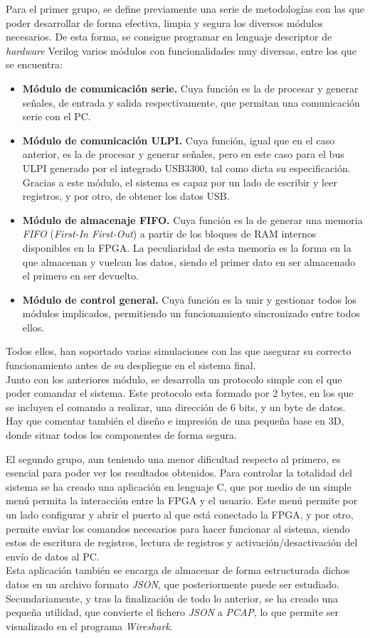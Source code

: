 \begin{resumen}
Para el primer grupo, se define previamente una serie de metodologías con las que poder desarrollar de forma efectiva, limpia y segura los diversos módulos necesarios. De esta forma, se consigue programar en lenguaje descriptor de \emph{hardware} Verilog varios módulos con funcionalidades muy diversas, entre los que se encuentra:
\begin{itemize}
    \item \textbf{Módulo de comunicación serie.} Cuya función es la de procesar y generar señales, de entrada y salida respectivamente, que permitan una comunicación serie con el PC.
    \item \textbf{Módulo de comunicación ULPI.} Cuya función, igual que en el caso anterior, es la de procesar y generar señales, pero en este caso para el bus ULPI generado por el integrado USB3300, tal como dicta su especificación. Gracias a este módulo, el sistema es capaz por un lado de escribir y leer registros, y por otro, de obtener los datos USB.
    \item \textbf{Módulo de almacenaje FIFO.} Cuya función es la de generar una memoria \emph{FIFO} (\emph{First-In First-Out}) a partir de los bloques de RAM internos disponibles en la FPGA. La peculiaridad de esta memoria es la forma en la que almacenan y vuelcan los datos, siendo el primer dato en ser almacenado el primero en ser devuelto.
    \item \textbf{Módulo de control general.} Cuya función es la unir y gestionar todos los módulos implicados, permitiendo un funcionamiento sincronizado entre todos ellos.
\end{itemize}
Todos ellos, han soportado varias simulaciones con las que asegurar su correcto funcionamiento antes de su despliegue en el sistema final. \\
Junto con los anteriores módulo, se desarrolla un protocolo simple con el que poder comandar el sistema. Este protocolo esta formado por 2 bytes, en los que se incluyen el comando a realizar, una dirección de 6 bits, y un byte de datos. \\
Hay que comentar también el diseño e impresión de una pequeña base en 3D, donde situar todos los componentes de forma segura.

El segundo grupo, aun teniendo una menor dificultad respecto al primero, es esencial para poder ver los resultados obtenidos. Para controlar la totalidad del sistema se ha creado una aplicación en lenguaje C, que por medio de un simple menú permita la interacción entre la FPGA y el usuario. Este menú permite por un lado configurar y abrir el puerto al que está conectado la FPGA, y por otro, permite enviar los comandos necesarios para hacer funcionar al sistema, siendo estos de escritura de registros, lectura de registros y activación/desactivación del envío de datos al PC. \\
Esta aplicación también se encarga de almacenar de forma estructurada dichos datos en un archivo formato \emph{JSON}, que posteriormente puede ser estudiado. Secundariamente, y tras la finalización de todo lo anterior, se ha creado una pequeña utilidad, que convierte el fichero \emph{JSON} a \emph{PCAP}, lo que permite ser visualizado en el programa \emph{Wireshark}.


\end{resumen}
